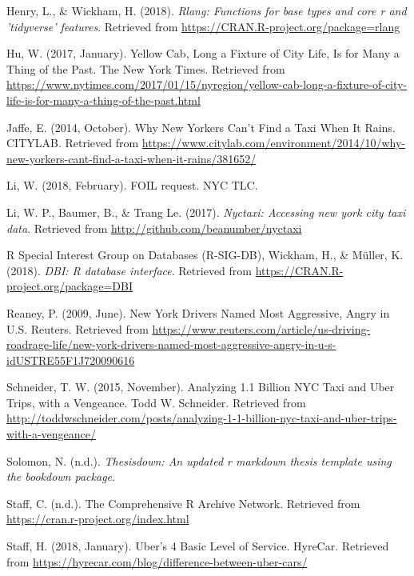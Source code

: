 \documentclass[12pt,twoside]{reedthesis}
\theoremstyle{definition}
\theoremstyle{definition}
\theoremstyle{definition}
\theoremstyle{remark}
\begin{document}
\hypertarget{ref-pkgrlang}{}
Henry, L., \& Wickham, H. (2018). \emph{Rlang: Functions for base types
and core r and 'tidyverse' features}. Retrieved from
\url{https://CRAN.R-project.org/package=rlang}

\hypertarget{ref-hu2017}{}
Hu, W. (2017, January). Yellow Cab, Long a Fixture of City Life, Is for
Many a Thing of the Past. The New York Times. Retrieved from
\url{https://www.nytimes.com/2017/01/15/nyregion/yellow-cab-long-a-fixture-of-city-life-is-for-many-a-thing-of-the-past.html}

\hypertarget{ref-citylab}{}
Jaffe, E. (2014, October). Why New Yorkers Can't Find a Taxi When It
Rains. CITYLAB. Retrieved from
\url{https://www.citylab.com/environment/2014/10/why-new-yorkers-cant-find-a-taxi-when-it-rains/381652/}

\hypertarget{ref-foirequest}{}
Li, W. (2018, February). FOIL request. NYC TLC.

\hypertarget{ref-pkgnyctaxi}{}
Li, W. P., Baumer, B., \& Trang Le. (2017). \emph{Nyctaxi: Accessing new
york city taxi data}. Retrieved from
\url{http://github.com/beanumber/nyctaxi}

\hypertarget{ref-pkgDBI}{}
R Special Interest Group on Databases (R-SIG-DB), Wickham, H., \&
Müller, K. (2018). \emph{DBI: R database interface}. Retrieved from
\url{https://CRAN.R-project.org/package=DBI}

\hypertarget{ref-reaney2009}{}
Reaney, P. (2009, June). New York Drivers Named Most Aggressive, Angry
in U.S. Reuters. Retrieved from
\url{https://www.reuters.com/article/us-driving-roadrage-life/new-york-drivers-named-most-aggressive-angry-in-u-s-idUSTRE55F1J720090616}

\hypertarget{ref-schneider2015}{}
Schneider, T. W. (2015, November). Analyzing 1.1 Billion NYC Taxi and
Uber Trips, with a Vengeance. Todd W. Schneider. Retrieved from
\url{http://toddwschneider.com/posts/analyzing-1-1-billion-nyc-taxi-and-uber-trips-with-a-vengeance/}

\hypertarget{ref-pkgthesisdown}{}
Solomon, N. (n.d.). \emph{Thesisdown: An updated r markdown thesis
template using the bookdown package}.

\hypertarget{ref-cran}{}
Staff, C. (n.d.). The Comprehensive R Archive Network. Retrieved from
\url{https://cran.r-project.org/index.html}

\hypertarget{ref-uberx}{}
Staff, H. (2018, January). Uber's 4 Basic Level of Service. HyreCar.
Retrieved from
\url{https://hyrecar.com/blog/difference-between-uber-cars/}
\end{document}
